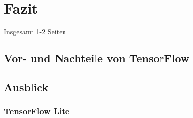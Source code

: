 \chapter{Fazit}
\label{chap:fazit}
\chapterauthor{\authorNiklas}
Insgesamt 1-2 Seiten
\section{Vor- und Nachteile von TensorFlow}
\label{sec:vorUndNachteileTensorFlow}

\section{Ausblick}
\label{sec:ausblick}

\subsection{TensorFlow Lite}
\label{sec:tensorFlowLite}
